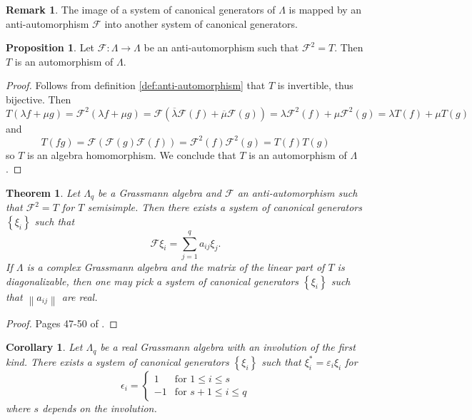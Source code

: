 \documentclass{article}
\newtheorem{theorem}{Theorem}
\newtheorem{corollary}{Corollary}[theorem]
\theoremstyle{definition}
\newtheorem{proposition}{Proposition}
\newtheorem*{remark}{Remark}
\begin{document}
\begin{remark}
    The image of a system of canonical generators of $\Lambda$ is mapped by an anti-automorphism $\mathcal{F}$ into another system of canonical generators.
\end{remark}

\begin{proposition}
    Let $\mathcal{F}: \Lambda \rightarrow \Lambda$ be an anti-automorphism such that $\mathcal{F}^2 = T$. Then $T$ is an automorphism of $\Lambda$.
\end{proposition}
\begin{proof}
    Follows from definition \ref{def:anti-automorphism} that $T$ is invertible, thus bijective. Then
    \begin{equation*}
        T(\lambda f + \mu g) = \mathcal{F}^2 (\lambda f + \mu g) = \mathcal{F} \left( \overline{\lambda} \mathcal{F}(f) + \overline{\mu} \mathcal{F}(g) \right)
        = \lambda \mathcal{F}^2(f) + \mu \mathcal{F}^2(g)
        = \lambda T(f) + \mu T(g)
    \end{equation*}
    and
    \begin{equation*}
        T(f g) = \mathcal{F}\left( \mathcal{F}(g) \mathcal{F}(f) \right)
        = \mathcal{F}^2(f) \mathcal{F}^2(g) = T(f) T(g)
    \end{equation*}
    so $T$ is an algebra homomorphism. We conclude that $T$ is an automorphism of $\Lambda$.
\end{proof}

\begin{theorem}
    Let $\Lambda_q$ be a Grassmann algebra and $\mathcal{F}$ an anti-automorphism such that $\mathcal{F}^2 = T$ for $T$ semisimple. Then there exists a system of canonical generators $\left\{ \xi_i \right\}$ such that 
    \begin{equation*}
        \mathcal{F} \xi_i = \sum_{j = 1}^q a_{ij} \xi_j.
    \end{equation*}
    If $\Lambda$ is a complex Grassmann algebra and the matrix of the linear part of $T$ is diagonalizable, then one may pick a system of canonical generators $\left\{ \xi_i \right\}$ such that $\left\| a_{ij} \right\|$ are real.
\end{theorem}
\begin{proof}
    Pages 47-50 of \cite{berezin_introduction_1987}.
\end{proof}

\begin{corollary}
    Let $\Lambda_q$ be a real Grassmann algebra with an involution of the first kind. There exists a system of canonical generators $\left\{ \xi_i \right\}$ such that $\xi_i^* = \varepsilon_i \xi_i$ for
    \begin{equation*}
        \epsilon_i = \left\{
            \begin{array}{cl}
                1 & \text{for } 1 \leq i \leq s \\
                -1 & \text{for } s + 1 \leq i \leq q
            \end{array} \right.
    \end{equation*}
    where $s$ depends on the involution.
\end{corollary}
\end{document}
